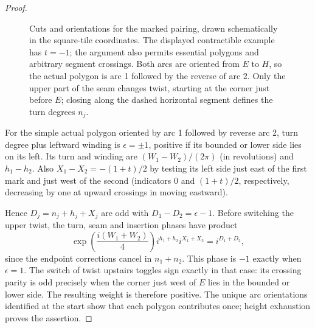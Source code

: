 \begin{proof}
\begin{figure}[tb]
\centering
{}
\caption{Cuts and orientations for the marked pairing, drawn schematically in the square-tile coordinates. The displayed contractible example has $t=-1$; the argument also permits essential polygons and arbitrary segment crossings. Both arcs are oriented from $E$ to $H$, so the actual polygon is arc 1 followed by the reverse of arc 2. Only the upper part of the seam changes twist, starting at the corner just before $E$; closing along the dashed horizontal segment defines the turn degrees $n_j$.}
\label{fig:marked-phase}
\end{figure}

For the simple actual polygon oriented by arc 1 followed by reverse arc 2, turn degree plus leftward winding is \(\epsilon=\pm1\), positive if its bounded or lower side lies on its left. Its turn and winding are \((W_1-W_2)/(2\pi)\) (in revolutions) and \(h_1-h_2\). Also \(X_1-X_2=-(1+t)/2\) by testing its left side just east of the first mark and just west of the second (indicators 0 and \((1+t)/2\), respectively, decreasing by one at upward crossings in moving eastward).

Hence \(D_j=n_j+h_j+X_j\) are odd with \(D_1-D_2=\epsilon-1\). Before switching the upper twist, the turn, seam and insertion phases have product
\[
 \exp\!\left(\frac{i(W_1+W_2)}4\right)
       i^{h_1+h_2}i^{X_1+X_2}=i^{D_1+D_2},
\]
since the endpoint corrections cancel in \(n_1+n_2\). This phase is \(-1\) exactly when \(\epsilon=1\). The switch of twist upstairs toggles sign exactly in that case: its crossing parity is odd precisely when the corner just west of \(E\) lies in the bounded or lower side. The resulting weight is therefore positive. The unique arc orientations identified at the start show that each polygon contributes once; height exhaustion proves the assertion.
\end{proof}

